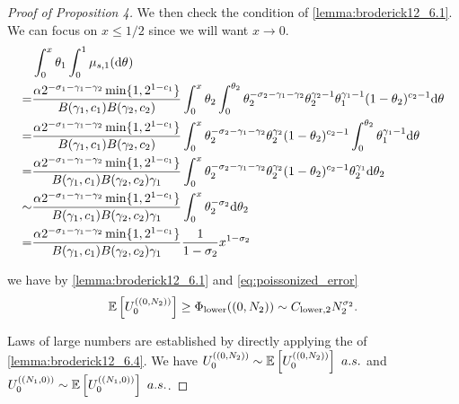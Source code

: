 \begin{proof}[Proof of Proposition 4]
We then check the condition of \cref{lemma:broderick12_6.1}. We can focus on $x\le 1/2$ since we will want $x\to 0$. 
\begin{align*}
    &\int_0^x \variantfreqperpop{1} \int_0^1 \mu_{s,1}(\de\vecvariantfreq{})\\
    =& \frac{\mass 2^{-\rate{1}-\corr{1}-\corr{2}}\min\{1, 2^{1-\conc{1}}\}}{B(\corr{1}, \conc{1})B(\corr{2}, \conc{2})}\int_0^x \variantfreqperpop{2} \int_0^{\variantfreqperpop{2}} \variantfreqperpop{2}^{-\rate{2}-\corr{1}-\corr{2}} \variantfreqperpop{2}^{\corr{2}-1}\variantfreqperpop{1}^{\corr{1}-1}(1-\variantfreqperpop{2})^{\conc{2}-1}\de\vecvariantfreq{}\\
    =& \frac{\mass 2^{-\rate{1}-\corr{1}-\corr{2}}\min\{1, 2^{1-\conc{1}}\}}{B(\corr{1}, \conc{1})B(\corr{2}, \conc{2})}\int_0^x \variantfreqperpop{2}^{-\rate{2}-\corr{1}-\corr{2}} \variantfreqperpop{2}^{\corr{2}} (1-\variantfreqperpop{2})^{\conc{2}-1} \int_0^{\variantfreqperpop{2}} \variantfreqperpop{1}^{\corr{1}-1}\de\vecvariantfreq{}\\
    =&\frac{\mass 2^{-\rate{1}-\corr{1}-\corr{2}}\min\{1, 2^{1-\conc{1}}\}}{B(\corr{1}, \conc{1})B(\corr{2}, \conc{2})\corr{1}}\int_0^x \variantfreqperpop{2}^{-\rate{2}-\corr{1}-\corr{2}} \variantfreqperpop{2}^{\corr{2}} (1-\variantfreqperpop{2})^{\conc{2}-1} \variantfreqperpop{2}^{\corr{1}}\de\variantfreqperpop{2}\\
    \sim & \frac{\mass 2^{-\rate{1}-\corr{1}-\corr{2}}\min\{1, 2^{1-\conc{1}}\}}{B(\corr{1}, \conc{1})B(\corr{2}, \conc{2})\corr{1}}\int_0^x \variantfreqperpop{2}^{-\rate{2}} \de\variantfreqperpop{2}\\
    =& \frac{\mass 2^{-\rate{1}-\corr{1}-\corr{2}}\min\{1, 2^{1-\conc{1}}\}}{B(\corr{1}, \conc{1})B(\corr{2}, \conc{2})\corr{1}} \frac{1}{1-\rate{2}}x^{1-\rate{2}}
\end{align*}

we have by \cref{lemma:broderick12_6.1} and \cref{eq:poissonized_error}
\begin{equation}
    \E \left[ \news{\zerovec}{(0,\samplesize{2})} \right] \ge \lowerbound((0,\samplesize{2}))\sim \constantlower{2} \samplesize{2}^{\rate{2}}.
    \label{eq:lowerbound_2l1_pop2} 
\end{equation}

Laws of large numbers are established by directly applying the  of~\citet{Broderick2012} \cref{lemma:broderick12_6.4}. We have $\news{\zerovec}{(0,\samplesize{2})}\sim \E \left[ \news{\zerovec}{(0,\samplesize{2})} \right]\ a.s. $ and $\news{\zerovec}{(\samplesize{1},0)}\sim \E \left[ \news{\zerovec}{(\samplesize{1},0)} \right]\ a.s. $.


\end{proof}

